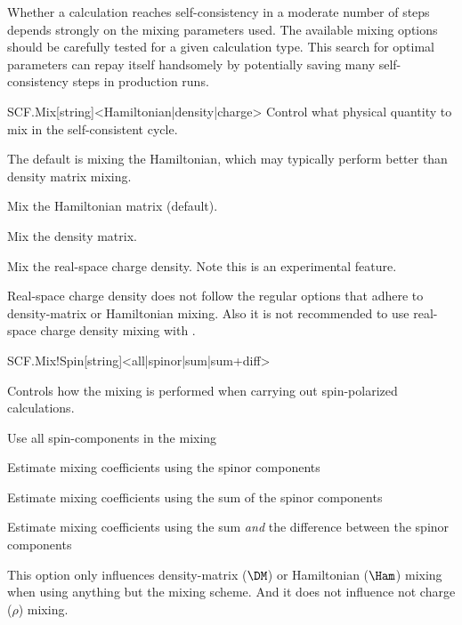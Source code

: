 Whether a calculation reaches self-consistency in a moderate number of
steps depends strongly on the mixing parameters used. The available
mixing options should be carefully tested for a given calculation
type. This search for optimal parameters can repay itself handsomely
by potentially saving many self-consistency steps in production runs.


\begin{fdfentry}{SCF.Mix}[string]<Hamiltonian|density|charge>
  Control what physical quantity to mix in the self-consistent cycle.

  The default is mixing the Hamiltonian, which may typically perform
  better than density matrix mixing. 

  \begin{fdfoptions}
    \option[Hamiltonian]%
    Mix the Hamiltonian matrix (default).

    \option[density]%
    Mix the density matrix.

    \option[charge]%
    Mix the real-space charge density. Note this is an experimental
    feature.

  \end{fdfoptions}
  
  \note Real-space charge density does not follow the regular options
  that adhere to density-matrix or Hamiltonian mixing. Also it is not
  recommended to use real-space charge density mixing with \tsiesta.

\end{fdfentry}

\begin{fdfentry}{SCF.Mix!Spin}[string]<all|spinor|sum|sum+diff>

  Controls how the mixing is performed when carrying out
  spin-polarized calculations.
  
  \begin{fdfoptions}
    \option[all] %
    Use all spin-components in the mixing

    \option[spinor] %
    Estimate mixing coefficients using the spinor components

    \option[sum] %
    Estimate mixing coefficients using the sum of the spinor
    components 

    Estimate mixing coefficients using the sum \emph{and} the
    difference between the spinor components 
  \end{fdfoptions}

  \note This option only influences density-matrix ($\DM$) or
  Hamiltonian ($\Ham$) mixing when using anything but the
   mixing scheme. And it does not influence not charge
  ($\rho$) mixing.
  
\end{fdfentry}

